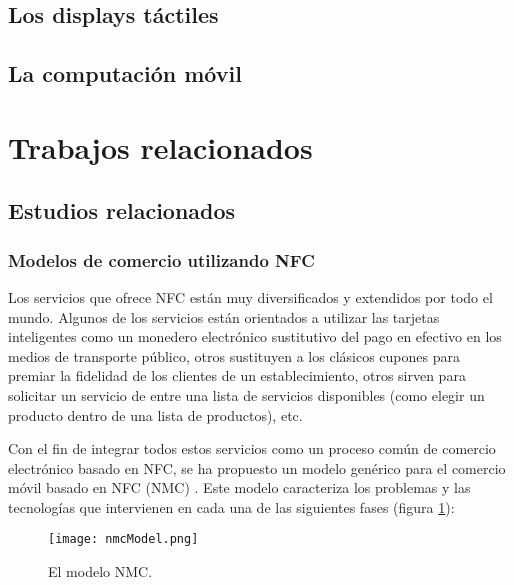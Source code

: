   \subsection{Los displays táctiles}

  \subsection{La computación móvil}

\section{Trabajos relacionados}
  \subsection{Estudios relacionados}
    \subsubsection{Modelos de comercio utilizando NFC}
  Los servicios que ofrece \acs{NFC} están muy diversificados y extendidos
  por todo el mundo. Algunos de los servicios están orientados a utilizar
  las tarjetas inteligentes como un monedero electrónico sustitutivo del
  pago en efectivo en los medios de transporte público, otros sustituyen
  a los clásicos cupones para premiar la fidelidad de los clientes de un
  establecimiento, otros sirven para solicitar un servicio de entre una
  lista de servicios disponibles (como elegir un producto dentro de una
  lista de productos), etc.

  Con el fin de integrar todos estos servicios como un proceso común de
  comercio electrónico basado en NFC, se ha propuesto un modelo genérico
  para el comercio móvil basado en \acs{NFC} (\acs{NMC})
  \cite{bib:nfcCommerce}. Este modelo caracteriza los problemas y las
  tecnologías que intervienen en cada una de las siguientes fases
  (figura \ref{fig:nmcModel}):

  \begin{figure}[!h]
    \begin{center}
      \texttt{[image: nmcModel.png]}
      \caption{El modelo \acs{NMC}.}
      \label{fig:nmcModel}
    \end{center}
  \end{figure}

